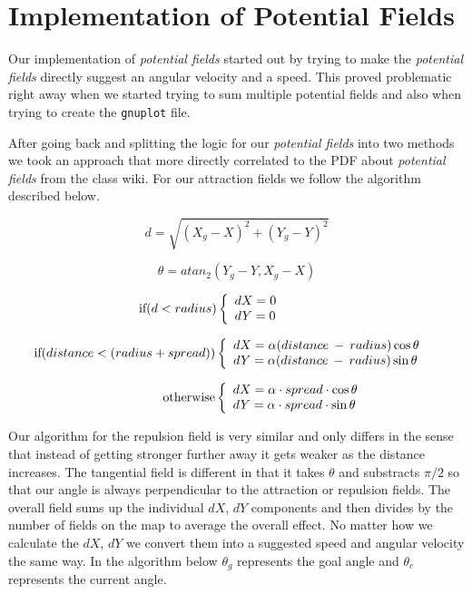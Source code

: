 \chapter{Implementation of Potential Fields}\label{chap:pf}
Our implementation of \textsl{potential fields} started out by trying to make the \textsl{potential fields} directly suggest an angular velocity and a speed.  This proved problematic right away when we started trying to sum multiple potential fields and also when trying to create the \texttt{gnuplot} file.  
\par
After going back and splitting the logic for our \textsl{potential fields} into two methods we took an approach that more directly correlated to the PDF about \textsl{potential fields} from the class wiki. For our attraction fields we follow the algorithm described below.
\par
$$d = \sqrt{(X_g - X)^2 + (Y_g - Y)^2}$$

$$\theta = atan_2 (Y_g - Y, X_g - X)$$


\[\mbox{if} ( d < radius ) \left\{  
\begin{array}{l l}
  dX = 0 \quad\quad\quad &\\
  dY = 0 &\\ \end{array} \right. \]

\[\mbox{if} (distance < (radius + spread)) \left\{  
\begin{array}{l l}
  dX = \alpha (distance\:-\:radius) \cos\theta &\\
  dY = \alpha (distance\:-\:radius) \sin\theta &\\ \end{array} \right. \]

\[\quad\quad\quad\quad\ \ \ \ \mbox{otherwise} \left\{  
\begin{array}{l l}
  dX = \alpha\cdot spread\cdot\cos\theta &\\
  dY = \alpha\cdot spread\cdot\sin\theta &\\ \end{array} \right. \]

\par
Our algorithm for the repulsion field is very similar and only differs in the sense that instead of getting stronger further away it gets weaker as the distance increases.  The tangential field is different in that it takes $\theta$ and substracts $\pi/2$ so that our angle is always perpendicular to the attraction or repulsion fields. The overall field sums up the individual $dX$, $dY$ components and then divides by the number of fields on the map to average the overall effect.  No matter how we calculate the $dX$, $dY$ we convert them into a suggested speed and angular velocity the same way.  In the algorithm below $\theta_g$ represents the goal angle and $\theta_c$ represents the current angle. 

